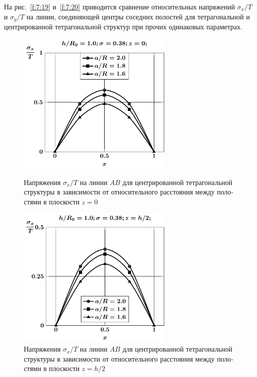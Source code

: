 \begin{russian}
На рис.~\ref{f:7:19} и~\ref{f:7:20} приводится сравнение относительных напряжений $\sigma_x/T$ и $\sigma_y/T$ на линии, соединяющей центры соседних полостей для тетрагональной и центрированной тетрагональной структур при прочих одинаковых параметрах.

\begin{figure}[h!]
\centering\footnotesize
\parbox[b]{7.5cm}{\centering\includegraphics[width=7.5cm]{cav5-a-h10-r10-z0-sig_x.pdf}
\caption{Напряжения $\sigma_x/T$ на линии $AB$ для центрированной тетрагональной структуры в зависимости от относительного расстояния между полостями в плоскости $z=0$ 
\label{f:7:95}}}\hfil\hfil
\parbox[b]{7.5cm}{\centering\includegraphics[width=7.5cm]{cav5-a-h10-r10-z1-sig_x.pdf}
\caption{Напряжения $\sigma_x/T$ на линии $AB$ для центрированной тетрагональной структуры в зависимости от относительного расстояния между полостями в плоскости $z=h/2$
\label{f:7:96}}}
\end{figure}


\end{russian}
